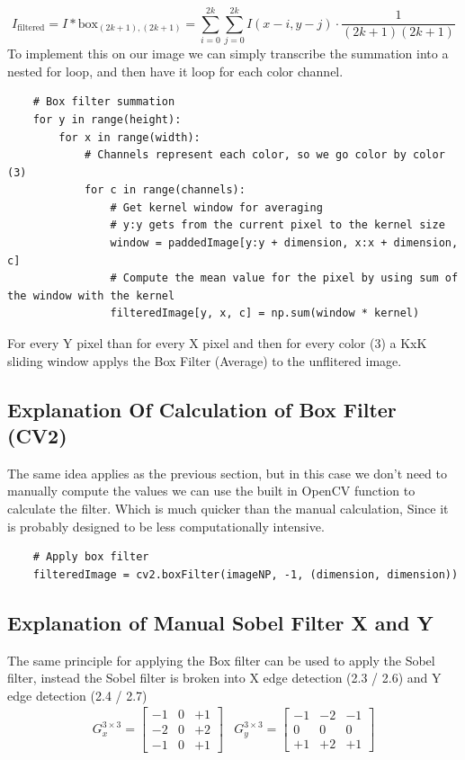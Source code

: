     \begin{equation}
    I_{\text{filtered}} = I * \text{box}_{(2k+1),(2k+1)} = \sum_{i=0}^{2k} \sum_{j=0}^{2k} I(x-i, y-j) \cdot \frac{1}{(2k+1)(2k+1)}
    \label{eq:filtered_image}
\end{equation}
To implement this on our image we can simply transcribe the summation into a nested for loop, and then have it loop for each color channel. 
\begin{verbatim}
    # Box filter summation
    for y in range(height):
        for x in range(width):
            # Channels represent each color, so we go color by color (3)
            for c in range(channels):
                # Get kernel window for averaging
                # y:y gets from the current pixel to the kernel size
                window = paddedImage[y:y + dimension, x:x + dimension, c]
                # Compute the mean value for the pixel by using sum of the window with the kernel
                filteredImage[y, x, c] = np.sum(window * kernel)
\end{verbatim}
For every Y pixel than for every X pixel and then for every color (3) a KxK sliding window applys the Box Filter (Average) to the unflitered image.
\subsection{Explanation Of Calculation of Box Filter (CV2)}
The same idea applies as the previous section, but in this case we don't need to manually compute the values we can use the built in OpenCV function to calculate the filter. Which is much quicker than the manual calculation, Since it is probably designed to be less computationally intensive.
\begin{verbatim}
    # Apply box filter
    filteredImage = cv2.boxFilter(imageNP, -1, (dimension, dimension))
\end{verbatim}
\subsection{Explanation of Manual Sobel Filter X and Y}
The same principle for applying the Box filter can be used to apply the Sobel filter, instead the Sobel filter is broken into X edge detection (2.3 / 2.6) and Y edge detection (2.4 / 2.7)
\begin{equation}
    \begin{array}{cc}
        G_x^{3 \times 3} = 
        \begin{bmatrix}
        -1 & 0 & +1 \\
        -2 & 0 & +2 \\
        -1 & 0 & +1
        \end{bmatrix} 
        &
        G_y^{3 \times 3} = 
        \begin{bmatrix}
        -1 & -2 & -1 \\
        0  & 0  & 0  \\
        +1 & +2 & +1
        \end{bmatrix} 
    \end{array}
    \label{eq:gx_gy_3x3}
\end{equation}

